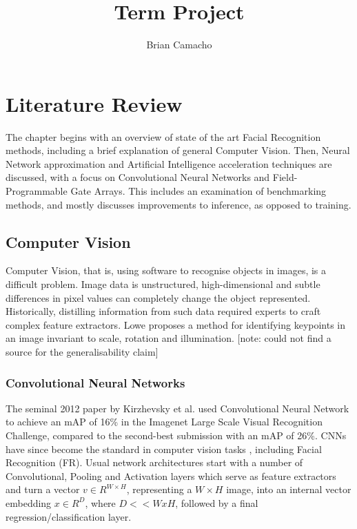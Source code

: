 \documentclass[12pt]{article}
\title{Term Project}
\author{Brian Camacho}
\begin{document}
\maketitle

\newpage
{}

\section{Literature Review}
The chapter begins with an overview of state of the art Facial Recognition methods, including
a brief explanation of general Computer Vision.
Then, Neural Network approximation and Artificial Intelligence acceleration techniques are
discussed, with a focus on Convolutional Neural Networks and Field-Programmable Gate Arrays. This
includes an  examination of benchmarking methods, and mostly discusses improvements to inference,
as opposed to training.

\subsection{Computer Vision}
Computer Vision, that is, using software to recognise objects in images, is a difficult
problem. Image data is unstructured, high-dimensional and subtle differences in pixel values
can completely change the object represented\cite{prince2012computer}.
Historically, distilling information from such data required experts to craft complex feature
extractors. Lowe\cite{lowe2004distinctive} proposes a method for identifying keypoints in an image
invariant to scale, rotation and illumination.
[note: could not find a source for the generalisability claim]

\subsubsection{Convolutional Neural Networks}
The seminal 2012 paper by Kirzhevsky et al. used Convolutional Neural Network to achieve an mAP
of 16\% in the Imagenet Large Scale Visual Recognition Challenge, compared to the second-best
submission with an mAP of 26\%\cite{ILSVRC15}.
CNNs have since become the standard in computer vision tasks \cite{sze2017efficient}, including
Facial Recognition (FR).
Usual network architectures start with a number of Convolutional, Pooling and Activation layers
which serve as feature extractors and turn a vector $v \in R^{W\times H}$, representing a
$W\times H$ image, into an internal vector embedding $x \in R^D$, where $D << WxH$, followed
by a final regression/classification layer.
\end{document}
